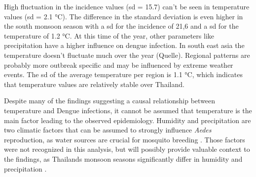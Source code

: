 High fluctuation in the incidence values (sd = 15.7) can’t be seen in temperature values (sd = 2.1 °C). The difference in the standard deviation is even higher in the south monsoon season with a sd for the incidence of 21,6 and a sd for the temperature of 1.2 °C. At this time of the year, other parameters like precipitation have a higher influence on dengue infection. In south east asia the temperature doesn’t fluctuate much over the year (Quelle).
Regional patterns are probably more outbreak specific and may be influenced by extreme weather events. The sd of the average temperature per region is 1.1 °C, which indicates that temperature values are relatively stable over Thailand.

Despite many of the findings suggesting a causal relationship between temperature and Dengue infections, it cannot be assumed that temperature is the main factor leading to the observed epidemiology. Humidity and precipitation are two climatic factors that can be assumed to strongly influence \emph{Aedes} reproduction, as water sources are crucial for mosquito breeding \citep{Abdullah2022} \citep{Li1985}.  Those factors were not recognized in this analysis, but will possibly provide valuable context to the findings, as Thailands monsoon seasons significantly differ in humidity and precipitation \citep{Kripalani1995}.
